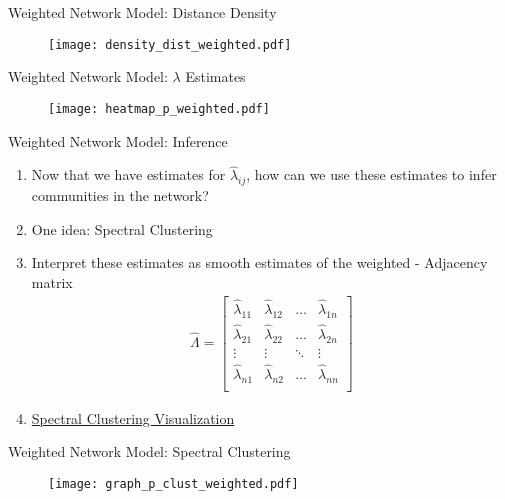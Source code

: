 \documentclass{beamer}
\begin{document}
\begin{frame}{Weighted Network Model: Distance Density}
\begin{figure}
    \centering
    \texttt{[image: density\_dist\_weighted.pdf]}
\end{figure}
\end{frame}

\begin{frame}{Weighted Network Model: $\lambda$ Estimates}
\begin{figure}
    \centering
    \texttt{[image: heatmap\_p\_weighted.pdf]}
\end{figure}
\end{frame}

\begin{frame}{Weighted Network Model: Inference}
\begin{enumerate}
\item Now that we have estimates for $\hat{\lambda}_{ij}$, how can we use these estimates to infer communities in the network? 
\item One idea: Spectral Clustering\pause
\item Interpret these estimates as smooth estimates of the weighted - Adjacency matrix 
\begin{align*}
\widehat{\Lambda} = \begin{bmatrix}
\hat{\lambda}_{11} & \hat{\lambda}_{12} & \dots & \hat{\lambda}_{1n}\\
\hat{\lambda}_{21} & \hat{\lambda}_{22} & \dots & \hat{\lambda}_{2n}\\
\vdots & \vdots & \ddots & \vdots\\
\hat{\lambda}_{n1} & \hat{\lambda}_{n2} & \dots & \hat{\lambda}_{nn}\\
\end{bmatrix}
\end{align*}
\item \href{https://plot.ly/~kkung/11}{Spectral Clustering Visualization}
\end{enumerate}
\end{frame}


\begin{frame}{Weighted Network Model: Spectral Clustering}
\begin{figure}
    \centering
    \texttt{[image: graph\_p\_clust\_weighted.pdf]}
\end{figure}
\end{frame}
\end{document}
